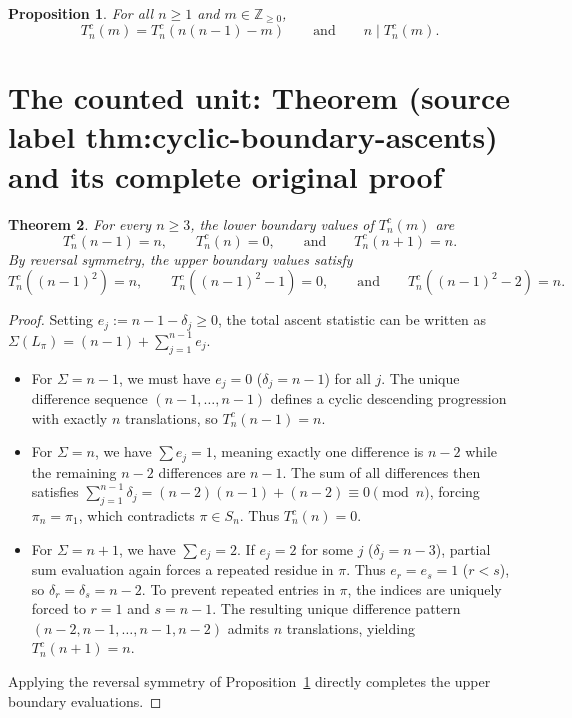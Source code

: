 \documentclass[10pt,a4paper]{amsart}
\theoremstyle{plain}
\newtheorem{theorem}{Theorem}[section]
\newtheorem{proposition}[theorem]{Proposition}
\begin{document}
\begin{proposition}
\label{prop:cyclic-symmetry-divisibility}
For all $n \ge 1$ and $m \in \mathbb{Z}_{\ge 0}$,
\begin{equation}
T_n^c(m) = T_n^c\left(n(n-1) - m\right) \qquad \text{and} \qquad n \mid T_n^c(m).
\end{equation}
\end{proposition}


\section{The counted unit: Theorem (source label thm:cyclic-boundary-ascents) and its complete original proof}

\begin{theorem}
\label{thm:cyclic-boundary-ascents}
For every $n \ge 3$, the lower boundary values of $T_n^c(m)$ are
\begin{equation}
T_n^c(n-1) = n, \qquad T_n^c(n) = 0, \qquad \text{and} \qquad T_n^c(n+1) = n.
\end{equation}
By reversal symmetry, the upper boundary values satisfy
\begin{equation}
T_n^c\left((n-1)^2\right) = n, \qquad T_n^c\left((n-1)^2-1\right) = 0, \qquad \text{and} \qquad T_n^c\left((n-1)^2-2\right) = n.
\end{equation}
\end{theorem}

\begin{proof}
Setting $e_j := n - 1 - \delta_j \ge 0$, the total ascent statistic can be written as $\Sigma(L_\pi) = (n-1) + \sum_{j=1}^{n-1} e_j$.

\begin{itemize}
    \item For $\Sigma = n-1$, we must have $e_j = 0$ ($\delta_j = n-1$) for all $j$. The unique difference sequence $(n-1, \dots, n-1)$ defines a cyclic descending progression with exactly $n$ translations, so $T_n^c(n-1) = n$.
    
    \item For $\Sigma = n$, we have $\sum e_j = 1$, meaning exactly one difference is $n-2$ while the remaining $n-2$ differences are $n-1$. The sum of all differences then satisfies $\sum_{j=1}^{n-1} \delta_j = (n-2)(n-1) + (n-2) \equiv 0 \pmod n$, forcing $\pi_n = \pi_1$, which contradicts $\pi \in S_n$. Thus $T_n^c(n) = 0$.
    
    \item For $\Sigma = n+1$, we have $\sum e_j = 2$. If $e_j = 2$ for some $j$ ($\delta_j = n-3$), partial sum evaluation again forces a repeated residue in $\pi$. Thus $e_r = e_s = 1$ ($r < s$), so $\delta_r = \delta_s = n-2$. To prevent repeated entries in $\pi$, the indices are uniquely forced to $r = 1$ and $s = n-1$. The resulting unique difference pattern $(n-2, n-1, \dots, n-1, n-2)$ admits $n$ translations, yielding $T_n^c(n+1) = n$.
\end{itemize}

Applying the reversal symmetry of Proposition~\ref{prop:cyclic-symmetry-divisibility} directly completes the upper boundary evaluations.
\end{proof}
\end{document}
